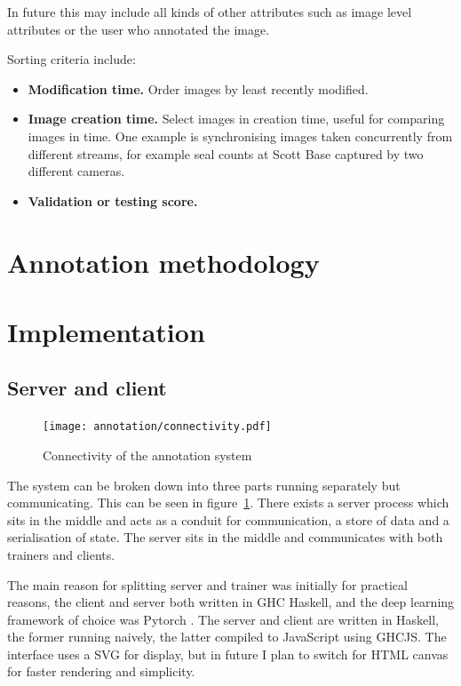 In future this may include all kinds of other attributes such as image level attributes or the user who annotated the image.

Sorting criteria include:

\begin{itemize}
    \item {\bf Modification time.}
Order images by least recently modified.
    \item {\bf Image creation time. }
Select images in creation time, useful for comparing images in time. One example is synchronising images taken concurrently from different streams, for example seal counts at Scott Base captured by two different cameras.
    \item {\bf Validation or testing score. }


\end{itemize}


\section{Annotation methodology}
\label{sec:annotation_methodology}



\section {Implementation}

\subsection{Server and client}

\begin{figure}[h!]
  \centering
  \texttt{[image: annotation/connectivity.pdf]}
  \caption{Connectivity of the annotation system}  
  \label{fig:connectivity}
\end{figure}

The system can be broken down into three parts running separately but communicating. This can be seen in figure~\ref{fig:connectivity}. There exists a server process which sits in the middle and acts as a conduit for communication, a store of data and a serialisation of state. The server sits in the middle and communicates with both trainers and clients.

The main reason for splitting server and trainer was initially for practical reasons, the client and server both written in \gls{GHC} Haskell, and the deep learning framework of choice was Pytorch \cite{Paszke2017}. The server and client are written in Haskell, the former running naively, the latter compiled to JavaScript using \gls{GHCJS}. The interface uses a \gls{SVG} for display, but in future I plan to switch for \gls{HTML} canvas for faster rendering and simplicity.

